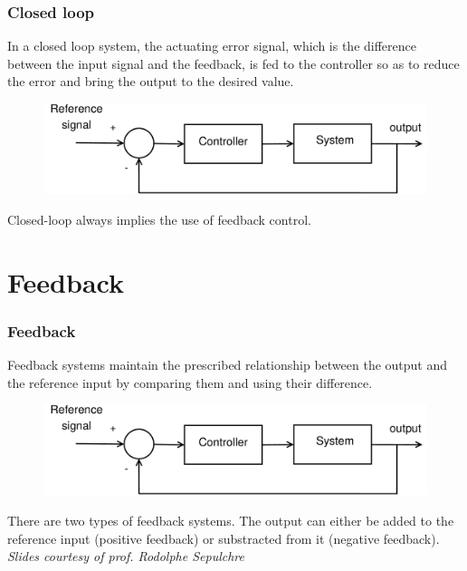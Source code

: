 \documentclass{beamer}
\begin{document}
\begin{frame}
\frametitle{Closed loop}
\vspace{-4ex}
In a closed loop system, the actuating error signal, which is the difference between the input signal and the feedback, is fed to the controller so as to reduce the error and bring the output to the desired value. 
\medskip
\begin{figure}
\includegraphics[width=1\linewidth]{closed_loop}
\end{figure}
\bigskip
Closed-loop always implies the use of feedback control.
\end{frame}

\section{Feedback} 

\begin{frame}
\frametitle{Feedback}
Feedback systems maintain the prescribed relationship between the output and the reference input by comparing them and using their difference.
\medskip
\begin{figure}
\includegraphics[width=1\linewidth]{closed_loop}
\end{figure}
There are two types of feedback systems. The output can either be added to the reference input (positive feedback) or substracted from it (negative feedback).\\
\medskip
\textit{Slides courtesy of prof. Rodolphe Sepulchre}
\end{frame}

\end{document}
